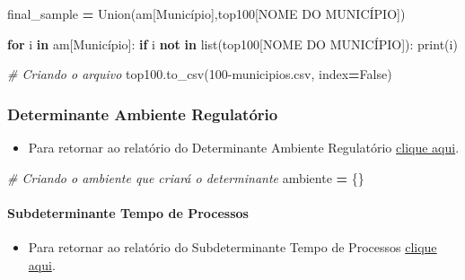 \documentclass[
  12,
  dvipsnames]{article}
\newenvironment{Shaded}{\begin{snugshade}}{\end{snugshade}}
\newcommand{\BuiltInTok}[1]{#1}
\newcommand{\CommentTok}[1]{\textcolor[rgb]{0.56,0.35,0.01}{\textit{#1}}}
\newcommand{\ControlFlowTok}[1]{\textcolor[rgb]{0.13,0.29,0.53}{\textbf{#1}}}
\newcommand{\KeywordTok}[1]{\textcolor[rgb]{0.13,0.29,0.53}{\textbf{#1}}}
\newcommand{\NormalTok}[1]{#1}
\newcommand{\OperatorTok}[1]{\textcolor[rgb]{0.81,0.36,0.00}{\textbf{#1}}}
\newcommand{\StringTok}[1]{\textcolor[rgb]{0.31,0.60,0.02}{#1}}
\newcommand{\VariableTok}[1]{\textcolor[rgb]{0.00,0.00,0.00}{#1}}
\providecommand{\tightlist}{%
  \setlength{\itemsep}{0pt}\setlength{\parskip}{0pt}}
\begin{document}
\begin{Shaded}
\begin{Highlighting}[]
\NormalTok{final\_sample }\OperatorTok{=}\NormalTok{ Union(am[}\StringTok{\textquotesingle{}Município\textquotesingle{}}\NormalTok{],top100[}\StringTok{\textquotesingle{}NOME DO MUNICÍPIO\textquotesingle{}}\NormalTok{])}

\ControlFlowTok{for}\NormalTok{ i }\KeywordTok{in}\NormalTok{ am[}\StringTok{\textquotesingle{}Município\textquotesingle{}}\NormalTok{]:}
    \ControlFlowTok{if}\NormalTok{ i }\KeywordTok{not} \KeywordTok{in} \BuiltInTok{list}\NormalTok{(top100[}\StringTok{\textquotesingle{}NOME DO MUNICÍPIO\textquotesingle{}}\NormalTok{]):}
        \BuiltInTok{print}\NormalTok{(i)}

\CommentTok{\# Criando o arquivo}
\NormalTok{top100.to\_csv(}\StringTok{\textquotesingle{}100{-}municipios.csv\textquotesingle{}}\NormalTok{, index}\OperatorTok{=}\VariableTok{False}\NormalTok{)}
\end{Highlighting}
\end{Shaded}

\hypertarget{script_2.1}{%
\subsubsection*{Determinante Ambiente Regulatório}\label{script_2.1}}

\begin{itemize}
\tightlist
\item
  Para retornar ao relatório do Determinante Ambiente Regulatório
  \protect\hyperlink{det_amb_regulatorio}{clique aqui}.
\end{itemize}

\begin{Shaded}
\begin{Highlighting}[]
\CommentTok{\# Criando o ambiente que criará o determinante}
\NormalTok{ambiente }\OperatorTok{=}\NormalTok{ \{\}}
\end{Highlighting}
\end{Shaded}

\hypertarget{script_2.1.1}{%
\paragraph*{Subdeterminante Tempo de Processos}\label{script_2.1.1}}

\begin{itemize}
\tightlist
\item
  Para retornar ao relatório do Subdeterminante Tempo de Processos
  \protect\hyperlink{subdet_tempo_processo}{clique aqui}.
\end{itemize}
\end{document}
